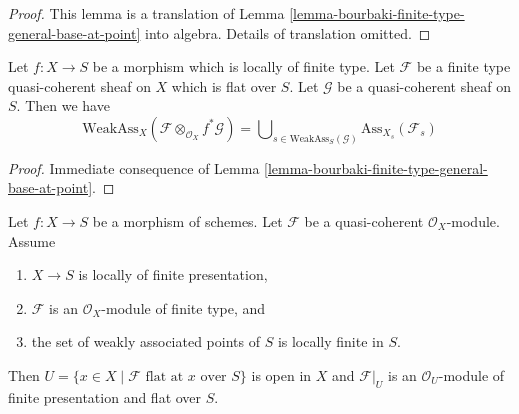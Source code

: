 \begin{proof}
This lemma is a translation of
Lemma \ref{lemma-bourbaki-finite-type-general-base-at-point}
into algebra. Details of translation omitted.
\end{proof}

\begin{lemma}
\label{lemma-bourbaki-finite-type-general-base}
Let $f : X \to S$ be a morphism which is locally of finite type.
Let $\mathcal{F}$ be a finite type quasi-coherent sheaf on $X$
which is flat over $S$. Let $\mathcal{G}$ be a quasi-coherent sheaf on $S$.
Then we have
$$
\text{WeakAss}_X(\mathcal{F} \otimes_{\mathcal{O}_X} f^*\mathcal{G}) =
\bigcup\nolimits_{s \in \text{WeakAss}_S(\mathcal{G})}
\text{Ass}_{X_s}(\mathcal{F}_s)
$$
\end{lemma}

\begin{proof}
Immediate consequence of
Lemma \ref{lemma-bourbaki-finite-type-general-base-at-point}.
\end{proof}

\begin{theorem}
\label{theorem-finite-type-flat}
Let $f : X \to S$ be a morphism of schemes.
Let $\mathcal{F}$ be a quasi-coherent $\mathcal{O}_X$-module.
Assume
\begin{enumerate}
\item $X \to S$ is locally of finite presentation,
\item $\mathcal{F}$ is an $\mathcal{O}_X$-module of finite type, and
\item the set of weakly associated points of $S$ is locally finite in $S$.
\end{enumerate}
Then $U = \{x \in X \mid \mathcal{F}\text{ flat at }x\text{ over }S\}$
is open in $X$ and $\mathcal{F}|_U$ is an $\mathcal{O}_U$-module
of finite presentation and flat over $S$.
\end{theorem}


